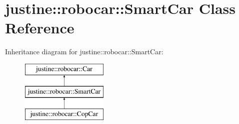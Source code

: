 \hypertarget{classjustine_1_1robocar_1_1SmartCar}{\section{justine\-:\-:robocar\-:\-:Smart\-Car Class Reference}
\label{classjustine_1_1robocar_1_1SmartCar}
}
Inheritance diagram for justine\-:\-:robocar\-:\-:Smart\-Car\-:\begin{figure}[H]
\begin{center}
\leavevmode
\includegraphics[height=3.000000cm]{classjustine_1_1robocar_1_1SmartCar}
\end{center}
\end{figure}
